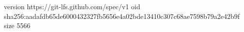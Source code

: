 version https://git-lfs.github.com/spec/v1
oid sha256:aadafdb65de6000432327fb5656e4a02bde13410c307c68ae7598b79a2e42b9f
size 5566
